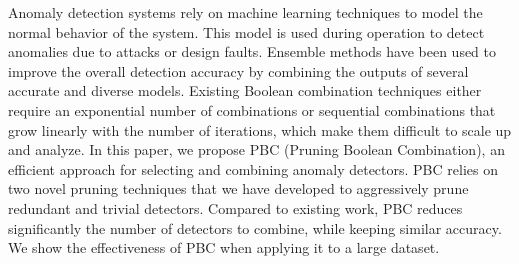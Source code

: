 Anomaly detection systems rely on machine learning techniques to model the normal behavior of the system. This model is used during operation to detect anomalies due to attacks or design faults. Ensemble methods have been used to improve the overall detection accuracy by combining the outputs of several accurate and diverse models. Existing Boolean combination techniques either require an exponential number of combinations or sequential combinations that grow linearly with the number of iterations, which make them difficult to scale up and analyze. In this paper, we propose PBC (Pruning Boolean Combination), an efficient approach for selecting and combining anomaly detectors. PBC relies on two novel pruning techniques that we have developed to aggressively prune redundant and trivial detectors. Compared to existing work, PBC reduces significantly the number of detectors to combine, while keeping similar accuracy. We show the effectiveness of PBC when applying it to a large dataset.
